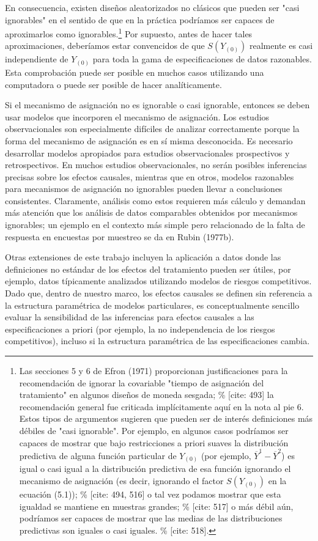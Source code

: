 \documentclass[12pt,a4paper]{article}
\begin{document}
{{En consecuencia, existen diseños aleatorizados no clásicos que pueden ser "casi ignorables" en el sentido de que en la práctica podríamos ser capaces de aproximarlos como ignorables.\footnote{Las secciones 5 y 6 de Efron (1971) proporcionan justificaciones para la recomendación de ignorar la covariable "tiempo de asignación del tratamiento" en algunos diseños de moneda sesgada; \% [cite: 493] la recomendación general fue criticada implícitamente aquí en la nota al pie 6. Estos tipos de argumentos sugieren que pueden ser de interés definiciones más débiles de "casi ignorable". Por ejemplo, en algunos casos podríamos ser capaces de mostrar que bajo restricciones a priori suaves la distribución predictiva de alguna función particular de $Y_{(0)}$ (por ejemplo, $\overline{Y}^1-\overline{Y}^2$) es igual o casi igual a la distribución predictiva de esa función ignorando el mecanismo de asignación (es decir, ignorando el factor $S(Y_{(0)})$ en la ecuación (5.1)); \% [cite: 494, 516] o tal vez podamos mostrar que esta igualdad se mantiene en muestras grandes; \% [cite: 517] o más débil aún, podríamos ser capaces de mostrar que las medias de las distribuciones predictivas son iguales o casi iguales. \% [cite: 518].} Por supuesto, antes de hacer tales aproximaciones, deberíamos estar convencidos de que $S(Y_{(0)})$ realmente es casi independiente de $Y_{(0)}$ para toda la gama de especificaciones de datos razonables. Esta comprobación puede ser posible en muchos casos utilizando una computadora o puede ser posible de hacer analíticamente.

Si el mecanismo de asignación no es ignorable o casi ignorable, entonces se deben usar modelos que incorporen el mecanismo de asignación. Los estudios observacionales son especialmente difíciles de analizar correctamente porque la forma del mecanismo de asignación es en sí misma desconocida. Es necesario desarrollar modelos apropiados para estudios observacionales prospectivos y retrospectivos. En muchos estudios observacionales, no serán posibles inferencias precisas sobre los efectos causales, mientras que en otros, modelos razonables para mecanismos de asignación no ignorables pueden llevar a conclusiones consistentes. Claramente, análisis como estos requieren más cálculo y demandan más atención que los análisis de datos comparables obtenidos por mecanismos ignorables; un ejemplo en el contexto más simple pero relacionado de la falta de respuesta en encuestas por muestreo se da en Rubin (1977b).

Otras extensiones de este trabajo incluyen la aplicación a datos donde las definiciones no estándar de los efectos del tratamiento pueden ser útiles, por ejemplo, datos típicamente analizados utilizando modelos de riesgos competitivos. Dado que, dentro de nuestro marco, los efectos causales se definen sin referencia a la estructura paramétrica de modelos particulares, es conceptualmente sencillo evaluar la sensibilidad de las inferencias para efectos causales a las especificaciones a priori (por ejemplo, la no independencia de los riesgos competitivos), incluso si la estructura paramétrica de las especificaciones cambia.

}}
\end{document}
